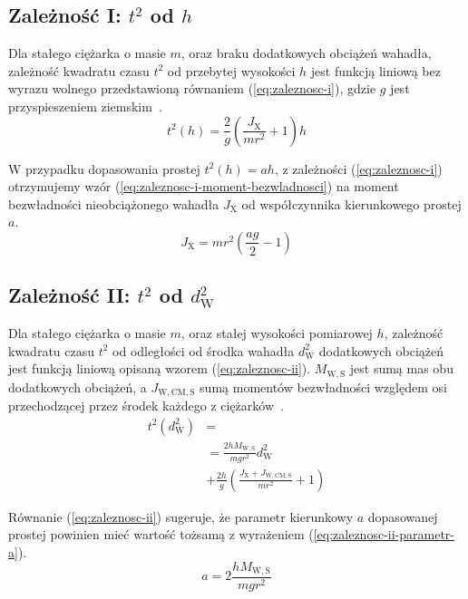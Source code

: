 \documentclass[twocolumn, a4paper, polish, 10pt]{article}
\newcommand{\JX}{\ensuremath{ J_{\mathrm{X}} }}
\newcommand{\JwCmS}{\ensuremath{ J_{\mathrm{W,CM,S}} }}
\newcommand{\MWS}{\ensuremath{ M_{\mathrm{W,S}} }}
\newcommand{\dwSq}{\ensuremath{ d_{\mathrm{W}}^2 }}
\begin{document}
\subsection{Zależność I: \texorpdfstring{$t^2$}{t²} od \texorpdfstring{$h$}{h}}
Dla stałego ciężarka o masie $m$, oraz braku dodatkowych obciążeń wahadła, zależność kwadratu czasu $t^2$ od przebytej wysokości $h$ jest funkcją liniową bez wyrazu wolnego przedstawioną równaniem (\ref{eq:zaleznosc-i}), gdzie $g$ jest przyspieszeniem ziemskim~\cite{pracownia-fizyczna-m7}.
\begin{equation}
    t^2(h) = \frac{2}{g} \left( \frac{\JX}{m r^2} + 1 \right) h
\label{eq:zaleznosc-i}
\end{equation}

W przypadku dopasowania prostej $t^2(h) = ah$, z zależności (\ref{eq:zaleznosc-i}) otrzymujemy wzór (\ref{eq:zaleznosc-i-moment-bezwladnosci}) na moment bezwładności nieobciążonego wahadła $\JX$ od współczynnika kierunkowego prostej $a$.
\begin{equation}
    \JX = mr^2 \left( \frac{ag}{2} - 1 \right)
\label{eq:zaleznosc-i-moment-bezwladnosci}
\end{equation}

\subsection{Zależność II: \texorpdfstring{$t^2$}{t²} od \texorpdfstring{$\dwSq$}{dw²}}
Dla stałego ciężarka o masie $m$, oraz stałej wysokości pomiarowej $h$, zależność kwadratu czasu $t^2$ od odległości od środka wahadła $\dwSq$ dodatkowych obciążeń jest funkcją liniową opisaną wzorem (\ref{eq:zaleznosc-ii}).
$\MWS$ jest sumą mas obu dodatkowych obciążeń, a $\JwCmS$ sumą momentów bezwładności względem osi przechodzącej przez środek każdego z ciężarków~\cite{pracownia-fizyczna-m7}.
\begin{equation}
\begin{split}
    t^2(\dwSq) &= \\
    &= \frac{2 h \MWS}{m g r^2} \dwSq \\
    &+ \frac{2h}{g} \left( \frac{\JX + \JwCmS}{m r^2} + 1\right)
\label{eq:zaleznosc-ii}
\end{split}
\end{equation}

Równanie (\ref{eq:zaleznosc-ii}) sugeruje, że parametr kierunkowy $a$ dopasowanej prostej powinien mieć wartość tożsamą z wyrażeniem (\ref{eq:zaleznosc-ii-parametr-a}).
\begin{equation}
    a = 2 \frac{h \MWS}{m g r^2}
\label{eq:zaleznosc-ii-parametr-a}
\end{equation}
\end{document}
